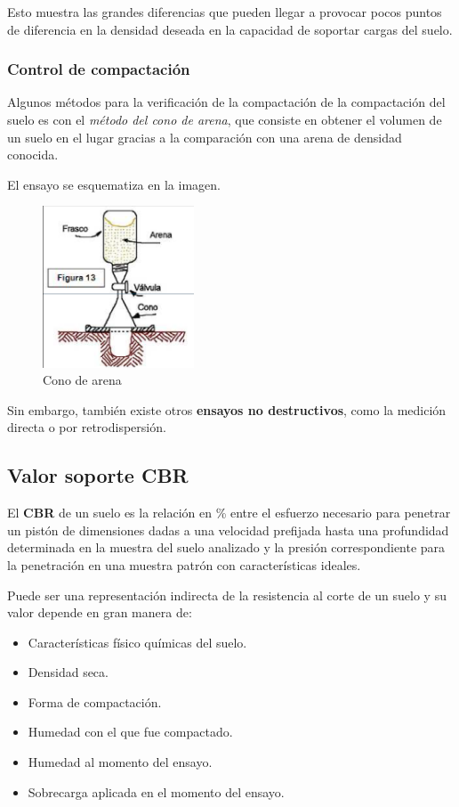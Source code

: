 \documentclass[../main.tex]{subfiles}
\begin{document}
Esto muestra las grandes diferencias que pueden llegar a provocar pocos puntos
de diferencia en la densidad deseada en la capacidad de soportar cargas del suelo.

\subsubsection{Control de compactación}

Algunos métodos para la verificación de la compactación de la compactación del
suelo es con el \textit{método del cono de arena}, que consiste en obtener el volumen
de un suelo en el lugar gracias a la comparación con una arena de densidad conocida.

El ensayo se esquematiza en la imagen.

\begin{figure}[ht]
  \centering
  \includegraphics[width=0.4\textwidth]{../images/20210422/cono_arena}
  \caption{Cono de arena}
  \label{fig:cono_arean}
\end{figure}

Sin embargo, también existe otros \textbf{ensayos no destructivos}, como la medición
directa o por retrodispersión.

\subsection{Valor soporte CBR}

El \textbf{CBR} de un suelo es la relación en \% entre el esfuerzo necesario
para penetrar un pistón de dimensiones dadas a una velocidad prefijada hasta una
profundidad determinada en la muestra del suelo analizado y la presión 
correspondiente para la penetración en una muestra patrón con características 
ideales. 

Puede ser una representación indirecta de la resistencia al corte de un suelo y
su valor depende en gran manera de:


\begin{itemize}
  \item Características físico químicas del suelo.
  \item Densidad seca.
  \item  Forma de compactación.
  \item  Humedad con el que fue compactado.
  \item Humedad al momento del ensayo.
  \item Sobrecarga aplicada en el momento del ensayo.
\end{itemize}
\end{document}
